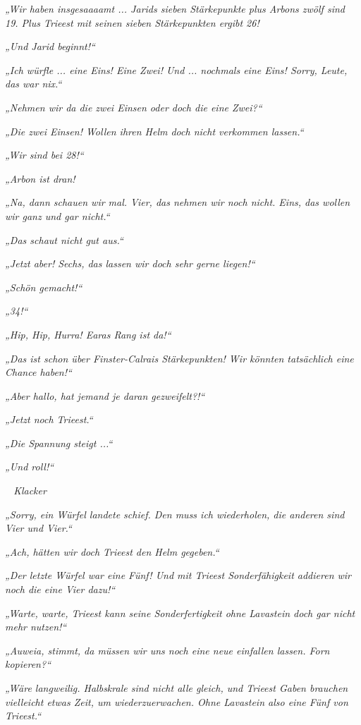 \textit{„Wir haben insgesaaaamt ... Jarids sieben Stärkepunkte plus Arbons zwölf sind 19. Plus Trieest mit seinen sieben Stärkepunkten ergibt 26!}

\textit{„Und Jarid beginnt!“}

\textit{„Ich würfle ... eine Eins! Eine Zwei! Und ... nochmals eine Eins! Sorry, Leute, das war nix.“}

\textit{„Nehmen wir da die zwei Einsen oder doch die eine Zwei?“}

\textit{„Die zwei Einsen! Wollen ihren Helm doch nicht verkommen lassen.“}

\textit{„Wir sind bei 28!“}

\textit{„Arbon ist dran!}

\textit{„Na, dann schauen wir mal. Vier, das nehmen wir noch nicht. Eins, das wollen wir ganz und gar nicht.“}

\textit{„Das schaut nicht gut aus.“}

\textit{„Jetzt aber! Sechs, das lassen wir doch sehr gerne liegen!“}

\textit{„Schön gemacht!“}

\textit{„34!“}

\textit{„Hip, Hip, Hurra! Earas Rang ist da!“}

\textit{„Das ist schon über Finster-Calrais Stärkepunkten! Wir könnten tatsächlich eine Chance haben!“}

\textit{„Aber hallo, hat jemand je daran gezweifelt?!“}

\textit{„Jetzt noch Trieest.“}

\textit{„Die Spannung steigt ...“}

\textit{„Und roll!“}

\textit{~ Klacker ~}

\textit{„Sorry, ein Würfel landete schief. Den muss ich wiederholen, die anderen sind Vier und Vier.“}

\textit{„Ach, hätten wir doch Trieest den Helm gegeben.“}

\textit{„Der letzte Würfel war eine Fünf! Und mit Trieest Sonderfähigkeit addieren wir noch die eine Vier dazu!“}

\textit{„Warte, warte, Trieest kann seine Sonderfertigkeit ohne Lavastein doch gar nicht mehr nutzen!“}

\textit{„Auweia, stimmt, da müssen wir uns noch eine neue einfallen lassen. Forn kopieren?“}

\textit{„Wäre langweilig. Halbskrale sind nicht alle gleich, und Trieest Gaben brauchen vielleicht etwas Zeit, um wiederzuerwachen. Ohne Lavastein also eine Fünf von Trieest.“}

